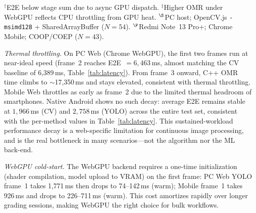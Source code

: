 \documentclass[conference]{IEEEtran}
\begin{document}
\begin{table}[!htbp]
\caption{YOLO Stage-Wise Latency Decomposition}
\label{tab:stages}
\centering
{}
\vspace{2pt}

\parbox{\columnwidth}{\footnotesize
$^{\dagger}$E2E below stage sum due to async GPU dispatch.
$^{\ddagger}$Higher OMR under WebGPU reflects CPU throttling from GPU heat.
$^{\S}$PC host; OpenCV.js \texttt{-msimd128} + SharedArrayBuffer ($N=54$).
$^{\P}$Redmi Note~13 Pro+; Chrome Mobile; COOP/COEP ($N=43$).}
\end{table}

\textit{Thermal throttling.}
On PC Web (Chrome WebGPU), the first two frames run at near-ideal
speed (frame~2 reaches E2E~$=6{,}463$\,ms, almost matching the CV
baseline of 6,389\,ms, Table~\ref{tab:latency}).
From frame~3 onward, C++ OMR time climbs to $\sim$17,350\,ms and
stays elevated, consistent with thermal throttling.
Mobile Web throttles as early as frame~2 due to the limited thermal
headroom of smartphones.
Native Android shows no such decay: average E2E remains stable at
$1{,}966$\,ms (CV) and $2{,}758$\,ms (YOLO) across the entire test
set, consistent with the per-method values in Table~\ref{tab:latency}.
This sustained-workload performance decay is a web-specific limitation
for continuous image processing, and is the real bottleneck in many
scenarios---not the algorithm nor the ML back-end.

\textit{WebGPU cold-start.}
The WebGPU backend requires a one-time initialization (shader
compilation, model upload to VRAM) on the first frame: PC Web YOLO
frame~1 takes 1,771\,ms then drops to 74--142\,ms (warm); Mobile
frame~1 takes 926\,ms and drops to 226--711\,ms (warm).
This cost amortizes rapidly over longer grading sessions, making
WebGPU the right choice for bulk workflows.
\end{document}
